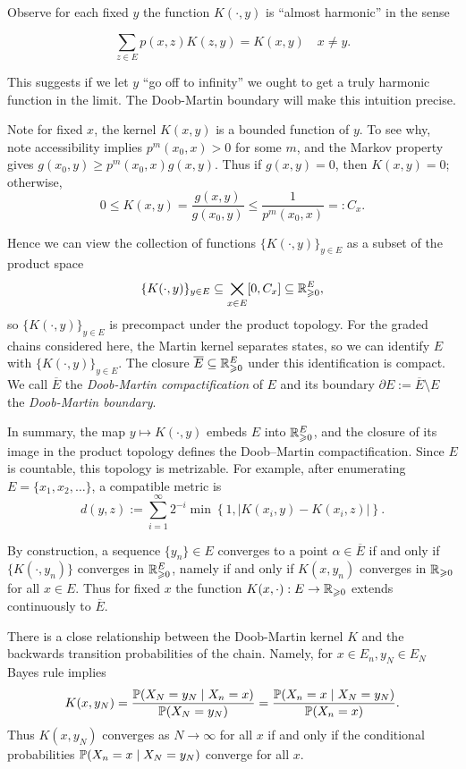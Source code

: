 \begin{subappendices}
%
\noindent Observe for each fixed $y$ the function $K(\cdot, y)$ is ``almost harmonic'' in the sense

\begin{equation*}
    \sum_{z \in E} p(x,z)K(z, y) = K(x,y) \quad x \neq y.
\end{equation*}


\noindent This suggests if we let $y$ ``go off to infinity'' we ought to get a truly
harmonic function in the limit. The Doob-Martin boundary will make this intuition precise.

\indent Note for fixed $x$, the kernel $K(x, y)$ is a bounded function of $y$. To see why,
 note accessibility implies $p^m(x_0, x) > 0$ for some $m$, and the Markov
property gives $g(x_0,y)\geq p^m(x_0,x)g(x,y)$. Thus
%
if $g(x,y)=0$, then $K(x,y)=0$; otherwise,
\[0 \leq K(x,y) = \frac{g(x,y)}{g(x_0, y)}
\leq \frac{1}{p^m(x_0,x)} =: C_x.\]

%
\noindent Hence we can view the collection of functions $\{K(\cdot, y) \}_{y \in E}$
as a subset of the product space
    \[\{K(\cdot, y) \}_{y \in E} \subseteq \bigtimes_{x \in E} [0, C_x] \subseteq \R^E_{\geq0},\]
\noindent so $\{K(\cdot, y) \}_{y \in E}$ is precompact under the product topology.
For the graded chains considered here, the Martin kernel separates states, so we can identify $E$ with
$\{K(\cdot, y) \}_{y \in E}$. The closure $\overline{E} \subseteq \R^E_{\geq 0}$ under this
identification is compact. We call $\overline{E}$ the \textit{Doob-Martin compactification}
of $E$ and its boundary $\partial E := \overline{E} \setminus E$ the \textit{Doob-Martin boundary}.

In summary, the map $y \mapsto K(\cdot,y)$ embeds $E$ into $\R^E_{\geq 0}$, and the
closure of its image in the product topology defines the Doob--Martin compactification.
Since $E$ is countable, this topology is metrizable. For example, after enumerating
$E = \{x_1,x_2,\ldots\}$, a compatible metric is
%
\[
d(y,z) := \sum_{i=1}^{\infty} 2^{-i}
\min\left\{1,\left|K(x_i,y)-K(x_i,z)\right|\right\}.
\]

%
\begin{remark}
\label{rmk:conv_in_dm}
    By construction, a sequence $\{y_n\} \in E$ converges to a point
    $\alpha \in \overline{E}$ if and only if $\{K(\cdot, y_n)\}$ converges
    in $\R^E_{\geq 0}$, namely if and only if $K(x, y_n)$ converges in $\R_{\geq 0}$
     for all $x \in E$. Thus for fixed $x$ the function
     $K(x, \cdot) : E \to \R_{\geq 0}$ extends continuously to $\overline{E}$.
\end{remark}
%
%
\noindent There is a close relationship between the Doob-Martin kernel $K$ and
the backwards transition probabilities of the chain. Namely, for
$x \in E_n, y_N \in E_{N}$ Bayes rule implies
%
\[K(x,y_N) = \frac{\P(X_{N} = y_N \; | \; X_n = x)}{\P(X_{N} = y_N)} = \frac{\P(X_n = x \; | \; X_{N} = y_N)}{\P(X_n = x)}.\]
%
\noindent Thus $K(x, y_N)$ converges as $N \to \infty$ for all $x$ if and only
 if the conditional probabilities $\P(X_n = x \; | \; X_N = y_N)$ converge for
 all $x$.


\end{subappendices}
